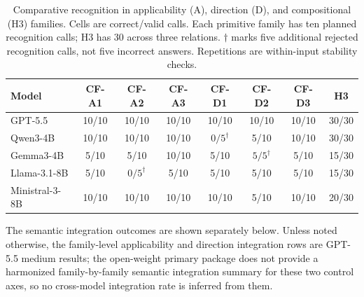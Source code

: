 \documentclass[11pt]{article}
\begin{document}
\begin{table}[t]
\centering
\small
\setlength{\tabcolsep}{3.5pt}
\begin{tabular}{@{}lccccccc@{}}
\toprule
Model & CF-A1 & CF-A2 & CF-A3 & CF-D1 & CF-D2 & CF-D3 & H3 \\
\midrule
GPT-5.5        & 10/10 & 10/10 & 10/10 & 10/10 & 10/10 & 10/10 & 30/30 \\
Qwen3-4B       & 10/10 & 10/10 & 10/10 & $0/5^{\dagger}$ & 5/10 & 10/10 & 30/30 \\
Gemma3-4B      & 5/10 & 5/10 & 10/10 & 5/10 & $5/5^{\dagger}$ & 5/10 & 15/30 \\
Llama-3.1-8B   & 5/10 & $0/5^{\dagger}$ & 5/10 & 5/10 & 5/10 & 5/10 & 15/30 \\
Ministral-3-8B & 10/10 & 10/10 & 10/10 & 10/10 & 5/10 & 10/10 & 20/30 \\
\bottomrule
\end{tabular}
\caption{Comparative recognition in applicability (A), direction (D), and compositional (H3) families. Cells are correct/valid calls. Each primitive family has ten planned recognition calls; H3 has 30 across three relations. $\dagger$ marks five additional rejected recognition calls, not five incorrect answers. Repetitions are within-input stability checks.}
\label{tab:control-axis-recognition}
\end{table}

The semantic integration outcomes are shown separately below. Unless noted otherwise, the family-level applicability and direction integration rows are GPT-5.5 medium results; the open-weight primary package does not provide a harmonized family-by-family semantic integration summary for these two control axes, so no cross-model integration rate is inferred from them.
\end{document}

